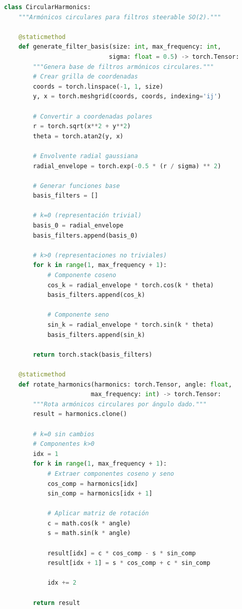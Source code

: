 \begin{listing}[h]
\begin{lstlisting}[language=Python]
class CircularHarmonics:
    """Armónicos circulares para filtros steerable SO(2)."""
    
    @staticmethod
    def generate_filter_basis(size: int, max_frequency: int, 
                             sigma: float = 0.5) -> torch.Tensor:
        """Genera base de filtros armónicos circulares."""
        # Crear grilla de coordenadas
        coords = torch.linspace(-1, 1, size)
        y, x = torch.meshgrid(coords, coords, indexing='ij')
        
        # Convertir a coordenadas polares
        r = torch.sqrt(x**2 + y**2)
        theta = torch.atan2(y, x)
        
        # Envolvente radial gaussiana
        radial_envelope = torch.exp(-0.5 * (r / sigma) ** 2)
        
        # Generar funciones base
        basis_filters = []
        
        # k=0 (representación trivial)
        basis_0 = radial_envelope
        basis_filters.append(basis_0)
        
        # k>0 (representaciones no triviales)
        for k in range(1, max_frequency + 1):
            # Componente coseno
            cos_k = radial_envelope * torch.cos(k * theta)
            basis_filters.append(cos_k)
            
            # Componente seno  
            sin_k = radial_envelope * torch.sin(k * theta)
            basis_filters.append(sin_k)
        
        return torch.stack(basis_filters)
    
    @staticmethod
    def rotate_harmonics(harmonics: torch.Tensor, angle: float, 
                        max_frequency: int) -> torch.Tensor:
        """Rota armónicos circulares por ángulo dado."""
        result = harmonics.clone()
        
        # k=0 sin cambios
        # Componentes k>0
        idx = 1
        for k in range(1, max_frequency + 1):
            # Extraer componentes coseno y seno
            cos_comp = harmonics[idx]
            sin_comp = harmonics[idx + 1]
            
            # Aplicar matriz de rotación
            c = math.cos(k * angle)
            s = math.sin(k * angle)
            
            result[idx] = c * cos_comp - s * sin_comp
            result[idx + 1] = s * cos_comp + c * sin_comp
            
            idx += 2
        
        return result
\end{lstlisting}
\caption{Generación y rotación de armónicos circulares}
\label{code:circular_harmonics}
\end{listing}

